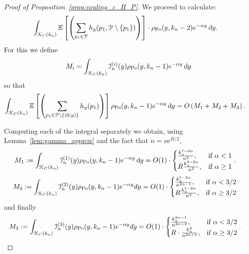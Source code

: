 \begin{proof}[Proof of Proposition~\ref{prop:couling_c_H_P}]
We proceed to calculate:
\begin{align*}
&\int_{{\mathcal K}_{C}(k_n)} \mathbb{E}\left[\left( \sum_{p_1 \in {\mathcal P}} h_y (p_1, {\mathcal P} \setminus \{ p_1 \})\right)\right] \cdot 
 \rho_{{\mathrm{Po}}}(y,k_n-2) e^{-\alpha y} \operatorname{\mathrm{d}\hspace{-2pt}} y.
\end{align*}
For this we define
\[
	M_i = \int_{{\mathcal K}_{C}(k_n)} \mathcal{I}_n^{(i)}(y) \rho_{{\mathrm{Po}}}(y,k_n-1) e^{-\alpha y} \operatorname{\mathrm{d}\hspace{-2pt}} y
\]
so that
\begin{align*}
\int_{{\mathcal K}_{C}(k_n)} \mathbb{E}\left[\left( \sum_{p_1 \in {\mathcal P} \setminus \{(0,y)\}} h_y (p_1)\right)\right] \rho_{{\mathrm{Po}}}(y,k_n-1) e^{-\alpha y} \operatorname{\mathrm{d}\hspace{-2pt}} y
&= O\left(M_1 + M_2 + M_3\right).
\end{align*}

Computing each of the integral separately we obtain, using Lemma~\ref{lem:gamma_approx} and the fact that $n = \nu e^{R/2}$,
\begin{align*} 
M_1:= \int_{{\mathcal K}_{C}(k_n)} \mathcal{I}_n^{(1)}(y) \rho_{{\mathrm{Po}}}(y,k_n-1) e^{-\alpha y} \operatorname{\mathrm{d}\hspace{-2pt}} y
&= O(1) \cdot 
\begin{cases} 
	\frac{k_n^{7-6\alpha}}{n^2}, & \mbox{if $\alpha <1$} \\
	R \frac{k_n^{3-2\alpha}}{n^2}, & \mbox{if $\alpha \geq 1$}
\end{cases}. 
\end{align*}
\begin{align*} 
M_2:= \int_{{\mathcal K}_{C}(k_n)} \mathcal{I}_n^{(2)}(y) \rho_{{\mathrm{Po}}}(y,k_n-1) e^{-\alpha y} dy
&= O(1) \cdot 
\begin{cases}
\frac{k_n^{1-2\alpha}}{n^{2\alpha-1}}, & \mbox{if $\alpha < 3/2$} \\
R   \frac{k_n^{1-2\alpha}}{n^{2}}, & \mbox{if $\alpha \geq 3/2$}
\end{cases}
\end{align*}
and finally 
\begin{align*} 
M_3:= \int_{{\mathcal K}_{C}(k_n)} \mathcal{I}_n^{(3)}(y) \rho_{{\mathrm{Po}}}(y,k_n-1) e^{-\alpha y} dy
&= O(1) \cdot 
\begin{cases} 
\frac{k_n^{2\alpha - 1}}{n^{4\alpha -2}}, & \mbox{if $\alpha <3/2$} \\ 
R \cdot \frac{k_n^2}{n^{2\alpha+1}}, &\mbox{if $\alpha \geq 3/2$}
\end{cases}  .
\end{align*}


\end{proof}
